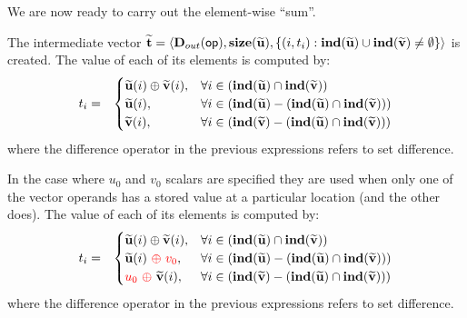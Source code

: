 We are now ready to carry out the element-wise ``sum''.

The intermediate vector ${\bf \widetilde{t}} = \langle
\mbox{$\mathbf{D}_{out}$}({\sf op}), \bold{size}({\bf \widetilde{u}}),
\{(i,t_i) : \bold{ind}({\bf \widetilde{u}}) \cup 
\bold{ind}({\bf \widetilde{v}})
 \neq \emptyset \} \rangle$
is created.  The value of each of its elements is computed by:
\begin{eqnarray*}
t_i & = & 
\begin{cases}
 {\bf \widetilde{u}}(i) \oplus {\bf \widetilde{v}}(i), & \forall i \in (\bold{ind}({\bf \widetilde{u}}) \cap \bold{ind}({\bf \widetilde{v}}))\\
 {\bf \widetilde{u}}(i), & \forall i \in (\bold{ind}({\bf \widetilde{u}}) - (\bold{ind}({\bf \widetilde{u}}) \cap \bold{ind}({\bf \widetilde{v}})))\\
  {\bf \widetilde{v}}(i), & \forall i \in (\bold{ind}({\bf \widetilde{v}}) - (\bold{ind}({\bf \widetilde{u}}) \cap \bold{ind}({\bf \widetilde{v}})))
\end{cases}
\end{eqnarray*}
where the difference operator in the previous expressions refers to set difference.

In the case where $u_0$ and $v_0$ scalars are specified they are used when only
one of the vector operands has a stored value at a particular location (and the other does).  
The value of each of its elements is computed by:
\begin{eqnarray*}
t_i & = & 
\begin{cases}
 {\bf \widetilde{u}}(i) \oplus {\bf \widetilde{v}}(i), & \forall i \in (\bold{ind}({\bf \widetilde{u}}) \cap \bold{ind}({\bf \widetilde{v}}))\\
 {\bf \widetilde{u}}(i) {\color{red}~ \oplus ~ v_0}, & \forall i \in (\bold{ind}({\bf \widetilde{u}}) - (\bold{ind}({\bf \widetilde{u}}) \cap \bold{ind}({\bf \widetilde{v}})))\\

 {\color{red} u_0 ~\oplus ~}{\bf \widetilde{v}}(i), & \forall i \in (\bold{ind}({\bf \widetilde{v}}) - (\bold{ind}({\bf \widetilde{u}}) \cap \bold{ind}({\bf \widetilde{v}})))
\end{cases}
\end{eqnarray*}
where the difference operator in the previous expressions refers to set difference.



